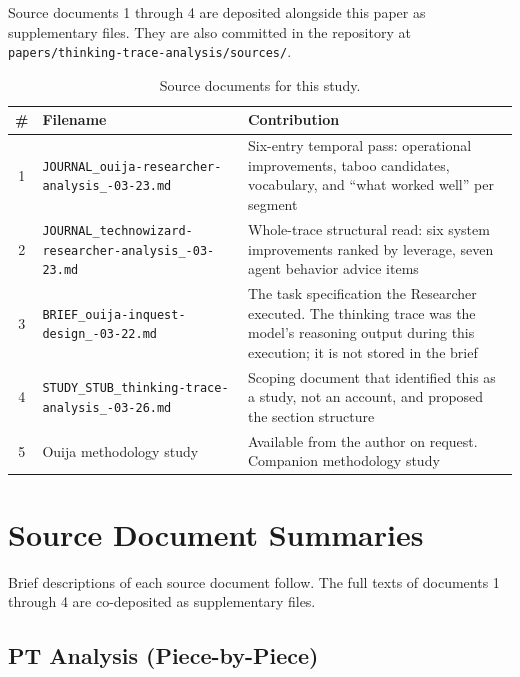 \documentclass[11pt,a4paper]{article}
\begin{document}
Source documents 1 through 4 are deposited alongside this paper as
supplementary files. They are also committed in the repository at
\texttt{papers/thinking-trace-analysis/sources/}.

\begin{table}[h]
\centering
\small
\caption{Source documents for this study.}
\label{tab:sources}
\begin{tabular}{@{}cp{4.5cm}p{7cm}@{}}
\toprule
\# & Filename & Contribution \\
\midrule
1 & {\small\raggedright\texttt{JOURNAL\_ouija-researcher-\allowbreak analysis\_\allowbreak 2026-03-23.md}} & Six-entry temporal pass: operational improvements, taboo candidates, vocabulary, and ``what worked well'' per segment \\[4pt]
2 & {\small\raggedright\texttt{JOURNAL\_technowizard-\allowbreak researcher-analysis\_\allowbreak 2026-03-23.md}} & Whole-trace structural read: six system improvements ranked by leverage, seven agent behavior advice items \\[4pt]
3 & {\small\raggedright\texttt{BRIEF\_ouija-inquest-\allowbreak design\_\allowbreak 2026-03-22.md}} & The task specification the Researcher executed. The thinking trace was the model's reasoning output during this execution; it is not stored in the brief \\[4pt]
4 & {\small\raggedright\texttt{STUDY\_STUB\_thinking-\allowbreak trace-analysis\_\allowbreak 2026-03-26.md}} & Scoping document that identified this as a study, not an account, and proposed the section structure \\[4pt]
5 & Ouija methodology study & Available from the author on request. Companion methodology study \\
\bottomrule
\end{tabular}
\end{table}

\appendix

\section{Source Document Summaries}
\label{app:summaries}

Brief descriptions of each source document follow. The full texts of documents
1 through 4 are co-deposited as supplementary files.

\subsection{PT Analysis (Piece-by-Piece)}
\end{document}
